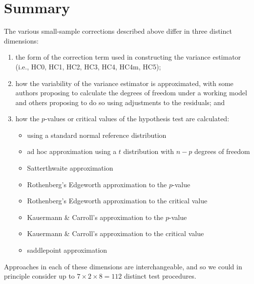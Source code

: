 \documentclass{article}\usepackage[]{graphicx}\usepackage[]{color}
\begin{document}
\section{Summary}

The various small-sample corrections described above differ in three distinct dimensions:
\begin{enumerate}
\item the form of the correction term used in constructing the variance estimator (i.e., HC0, HC1, HC2, HC3, HC4, HC4m, HC5);
\item how the variability of the variance estimator is approximated, with some authors proposing to calculate the degrees of freedom under a working model and others proposing to do so using adjustments to the residuals; and
\item how the $p$-values or critical values of the hypothesis test are calculated:
\begin{itemize}
\item using a standard normal reference distribution
\item ad hoc approximation using a $t$ distribution with $n - p$ degrees of freedom
\item Satterthwaite approximation
\item Rothenberg's Edgeworth approximation to the $p$-value
\item Rothenberg's Edgeworth approximation to the critical value
\item Kauermann \& Carroll's approximation to the $p$-value
\item Kauermann \& Carroll's approximation to the critical value
\item saddlepoint approximation
\end{itemize}
\end{enumerate}
Approaches in each of these dimensions are interchangeable, and so we could in principle consider up to $7 \times 2 \times 8 = 112$ distinct test procedures. 
\end{document}
